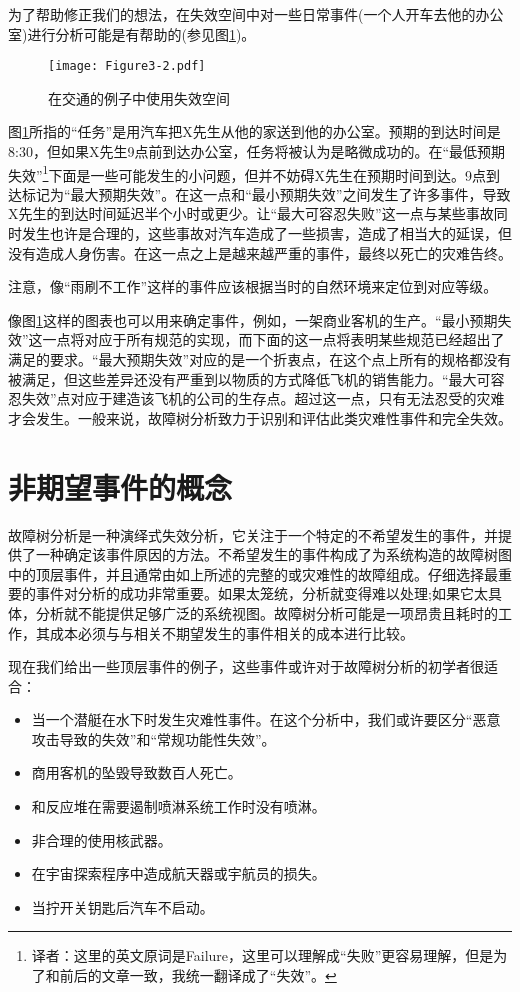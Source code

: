 \documentclass[cn,11pt,chinese]{elegantbook}
\begin{document}
为了帮助修正我们的想法，在失效空间中对一些日常事件(一个人开车去他的办公室)进行分析可能是有帮助的(参见图\ref{fig:fig3_2})。

\begin{figure}[h]
	\centering
	\texttt{[image: Figure3-2.pdf]}
	\caption{在交通的例子中使用失效空间}\label{fig:fig3_2}
\end{figure}

图\ref{fig:fig3_2}所指的“任务”是用汽车把X先生从他的家送到他的办公室。预期的到达时间是8:30，但如果X先生9点前到达办公室，任务将被认为是略微成功的。在“最低预期失效”\footnote{译者：这里的英文原词是Failure，这里可以理解成“失败”更容易理解，但是为了和前后的文章一致，我统一翻译成了“失效”。}下面是一些可能发生的小问题，但并不妨碍X先生在预期时间到达。9点到达标记为“最大预期失效”。在这一点和“最小预期失效”之间发生了许多事件，导致X先生的到达时间延迟半个小时或更少。让“最大可容忍失败”这一点与某些事故同时发生也许是合理的，这些事故对汽车造成了一些损害，造成了相当大的延误，但没有造成人身伤害。在这一点之上是越来越严重的事件，最终以死亡的灾难告终。

注意，像“雨刷不工作”这样的事件应该根据当时的自然环境来定位到对应等级。

像图\ref{fig:fig3_2}这样的图表也可以用来确定事件，例如，一架商业客机的生产。“最小预期失效”这一点将对应于所有规范的实现，而下面的这一点将表明某些规范已经超出了满足的要求。“最大预期失效”对应的是一个折衷点，在这个点上所有的规格都没有被满足，但这些差异还没有严重到以物质的方式降低飞机的销售能力。“最大可容忍失效”点对应于建造该飞机的公司的生存点。超过这一点，只有无法忍受的灾难才会发生。一般来说，故障树分析致力于识别和评估此类灾难性事件和完全失效。


\section{非期望事件的概念}

故障树分析是一种演绎式失效分析，它关注于一个特定的不希望发生的事件，并提供了一种确定该事件原因的方法。不希望发生的事件构成了为系统构造的故障树图中的顶层事件，并且通常由如上所述的完整的或灾难性的故障组成。仔细选择最重要的事件对分析的成功非常重要。如果太笼统，分析就变得难以处理;如果它太具体，分析就不能提供足够广泛的系统视图。故障树分析可能是一项昂贵且耗时的工作，其成本必须与与相关不期望发生的事件相关的成本进行比较。

现在我们给出一些顶层事件的例子，这些事件或许对于故障树分析的初学者很适合：

\begin{itemize}
	\item 当一个潜艇在水下时发生灾难性事件。在这个分析中，我们或许要区分“恶意攻击导致的失效”和“常规功能性失效”。
	\item 商用客机的坠毁导致数百人死亡。
	\item 和反应堆在需要遏制喷淋系统工作时没有喷淋。
	 \item 非合理的使用核武器。
	\item 在宇宙探索程序中造成航天器或宇航员的损失。
	\item 当拧开关钥匙后汽车不启动。
\end{itemize}
\end{document}
